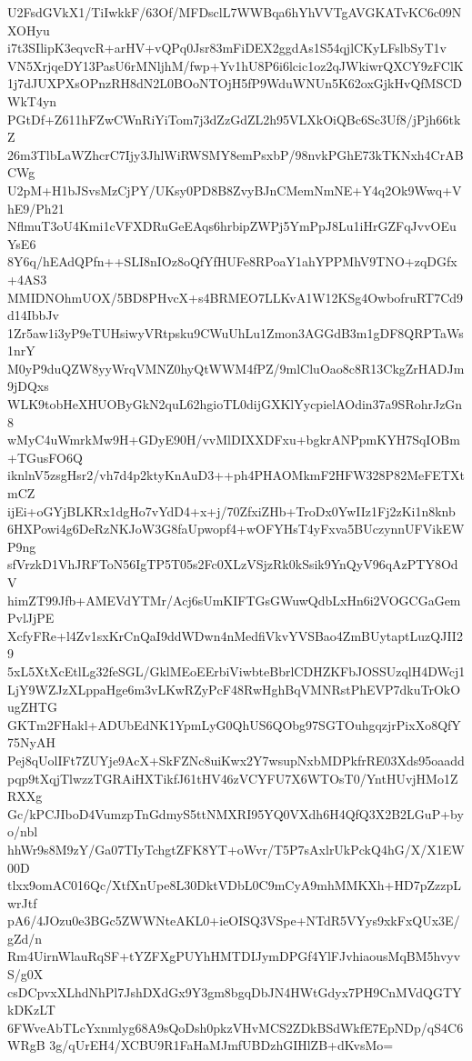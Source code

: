 U2FsdGVkX1/TiIwkkF/63Of/MFDsclL7WWBqa6hYhVVTgAVGKATvKC6c09NXOHyu
i7t3SIlipK3eqvcR+arHV+vQPq0Jsr83mFiDEX2ggdAs1S54qjlCKyLFslbSyT1v
VN5XrjqeDY13PasU6rMNljhM/fwp+Yv1hU8P6i6lcic1oz2qJWkiwrQXCY9zFClK
1j7dJUXPXsOPnzRH8dN2L0BOoNTOjH5fP9WduWNUn5K62oxGjkHvQfMSCDWkT4yn
PGtDf+Z611hFZwCWnRiYiTom7j3dZzGdZL2h95VLXkOiQBc6Sc3Uf8/jPjh66tkZ
26m3TlbLaWZhcrC7Ijy3JhlWiRWSMY8emPsxbP/98nvkPGhE73kTKNxh4CrABCWg
U2pM+H1bJSvsMzCjPY/UKsy0PD8B8ZvyBJnCMemNmNE+Y4q2Ok9Wwq+VhE9/Ph21
NflmuT3oU4Kmi1cVFXDRuGeEAqs6hrbipZWPj5YmPpJ8Lu1iHrGZFqJvvOEuYsE6
8Y6q/hEAdQPfn++SLI8nIOz8oQfYfHUFe8RPoaY1ahYPPMhV9TNO+zqDGfx+4AS3
MMIDNOhmUOX/5BD8PHvcX+s4BRMEO7LLKvA1W12KSg4OwbofruRT7Cd9d14IbbJv
1Zr5aw1i3yP9eTUHsiwyVRtpsku9CWuUhLu1Zmon3AGGdB3m1gDF8QRPTaWs1nrY
M0yP9duQZW8yyWrqVMNZ0hyQtWWM4fPZ/9mlCluOao8c8R13CkgZrHADJm9jDQxs
WLK9tobHeXHUOByGkN2quL62hgioTL0dijGXKlYycpielAOdin37a9SRohrJzGn8
wMyC4uWmrkMw9H+GDyE90H/vvMlDIXXDFxu+bgkrANPpmKYH7SqIOBm+TGusFO6Q
iknlnV5zsgHsr2/vh7d4p2ktyKnAuD3++ph4PHAOMkmF2HFW328P82MeFETXtmCZ
ijEi+oGYjBLKRx1dgHo7vYdD4+x+j/70ZfxiZHb+TroDx0YwIIz1Fj2zKi1n8knb
6HXPowi4g6DeRzNKJoW3G8faUpwopf4+wOFYHsT4yFxva5BUczynnUFVikEWP9ng
sfVrzkD1VhJRFToN56IgTP5T05s2Fc0XLzVSjzRk0kSsik9YnQyV96qAzPTY8OdV
himZT99Jfb+AMEVdYTMr/Acj6sUmKIFTGsGWuwQdbLxHn6i2VOGCGaGemPvlJjPE
XcfyFRe+l4Zv1sxKrCnQaI9ddWDwn4nMedfiVkvYVSBao4ZmBUytaptLuzQJII29
5xL5XtXcEtlLg32feSGL/GklMEoEErbiViwbteBbrlCDHZKFbJOSSUzqlH4DWcj1
LjY9WZJzXLppaHge6m3vLKwRZyPcF48RwHghBqVMNRstPhEVP7dkuTrOkOugZHTG
GKTm2FHakl+ADUbEdNK1YpmLyG0QhUS6QObg97SGTOuhgqzjrPixXo8QfY75NyAH
Pej8qUolIFt7ZUYje9AcX+SkFZNc8uiKwx2Y7wsupNxbMDPkfrRE03Xds95oaadd
pqp9tXqjTlwzzTGRAiHXTikfJ61tHV46zVCYFU7X6WTOsT0/YntHUvjHMo1ZRXXg
Gc/kPCJIboD4VumzpTnGdmyS5ttNMXRI95YQ0VXdh6H4QfQ3X2B2LGuP+byo/nbl
hhWr9s8M9zY/Ga07TIyTchgtZFK8YT+oWvr/T5P7sAxlrUkPckQ4hG/X/X1EW00D
tlxx9omAC016Qc/XtfXnUpe8L30DktVDbL0C9mCyA9mhMMKXh+HD7pZzzpLwrJtf
pA6/4JOzu0e3BGc5ZWWNteAKL0+ieOISQ3VSpe+NTdR5VYys9xkFxQUx3E/gZd/n
Rm4UirnWlauRqSF+tYZFXgPUYhHMTDIJymDPGf4YlFJvhiaousMqBM5hvyvS/g0X
csDCpvxXLhdNhPl7JshDXdGx9Y3gm8bgqDbJN4HWtGdyx7PH9CnMVdQGTYkDKzLT
6FWveAbTLcYxnmlyg68A9sQoDsh0pkzVHvMCS2ZDkBSdWkfE7EpNDp/qS4C6WRgB
3g/qUrEH4/XCBU9R1FaHaMJmfUBDzhGIHlZB+dKvsMo=
